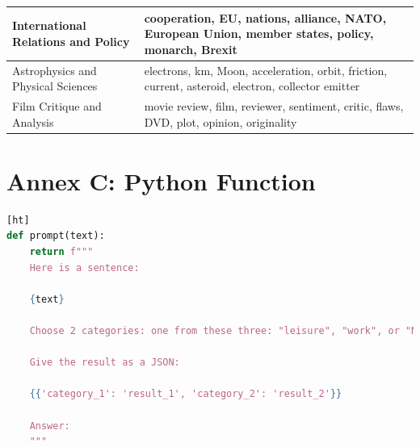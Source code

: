 \documentclass{article}
\begin{document}
\begin{table}[ht]
\begin{tabular}{|m{6cm}|m{9cm}|}
    International Relations and Policy   & cooperation, EU, nations, alliance, NATO, European Union, member states, policy, monarch, Brexit                       \\ \hline
    Astrophysics and Physical Sciences   & electrons, km, Moon, acceleration, orbit, friction, current, asteroid, electron, collector emitter                     \\ \hline
    Film Critique and Analysis           & movie review, film, reviewer, sentiment, critic, flaws, DVD, plot, opinion, originality                                 \\ \hline
  \end{tabular}
\end{table}

\FloatBarrier %



\section*{Annex C: Python Function}
\begin{lstlisting}[language=Python, caption={Python function to generate a prompt}][ht]
def prompt(text):
    return f"""
    Here is a sentence:

    {text}

    Choose 2 categories: one from these three: "leisure", "work", or "None", AND one from these three: "future", "past", or "None".

    Give the result as a JSON:

    {{'category_1': 'result_1', 'category_2': 'result_2'}}

    Answer:
    """
\end{lstlisting}

\FloatBarrier %
\end{document}
